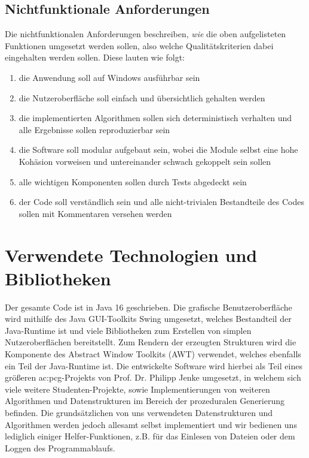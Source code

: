 \subsection{Nichtfunktionale Anforderungen}
Die nichtfunktionalen Anforderungen beschreiben, \textit{wie} die oben aufgelisteten Funktionen umgesetzt werden sollen, also
welche Qualitätskriterien dabei eingehalten werden sollen. Diese lauten wie folgt:

\begin{enumerate}
    \item die Anwendung soll auf Windows ausführbar sein
    \item die Nutzeroberfläche soll einfach und übersichtlich gehalten werden
    \item die implementierten Algorithmen sollen sich deterministisch verhalten und alle Ergebnisse sollen reproduzierbar sein
    \item die Software soll modular aufgebaut sein, wobei die Module selbst eine hohe Kohäsion vorweisen und untereinander schwach gekoppelt sein sollen
    \item alle wichtigen Komponenten sollen durch Tests abgedeckt sein
    \item der Code soll verständlich sein und alle nicht-trivialen Bestandteile des Codes sollen mit Kommentaren versehen werden
\end{enumerate}

\section{Verwendete Technologien und Bibliotheken}
Der gesamte Code ist in Java 16 geschrieben. Die grafische Benutzeroberfläche wird mithilfe des Java GUI-Toolkits Swing umgesetzt,
welches Bestandteil der Java-Runtime ist und viele Bibliotheken zum Erstellen von simplen Nutzeroberflächen bereitstellt. Zum Rendern
der erzeugten Strukturen wird die  Komponente des Abstract Window Toolkits (AWT) verwendet, welches ebenfalls ein
Teil der Java-Runtime ist. Die entwickelte Software wird hierbei als Teil eines größeren \gls{ac:pcg}-Projekts von Prof. Dr. Philipp Jenke umgesetzt,
in welchem sich viele weitere Studenten-Projekte, sowie Implementierungen von weiteren Algorithmen und Datenstrukturen im Bereich der prozeduralen
Generierung befinden. Die grundsätzlichen von uns verwendeten Datenstrukturen und Algorithmen werden jedoch allesamt selbst implementiert
und wir bedienen uns lediglich einiger Helfer-Funktionen, z.B. für das Einlesen von Dateien oder dem Loggen des Programmablaufs.

